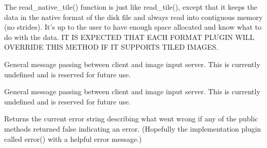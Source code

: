 The {\kw read_native_tile()} function is just like {\kw read_tile()}, 
except that it keeps the data in the native format of the disk file and
always read into contiguous memory (no strides).  It's up to the user to
have enough space allocated and know what to do with the data.  IT IS
EXPECTED THAT EACH FORMAT PLUGIN WILL OVERRIDE THIS METHOD IF IT
SUPPORTS TILED IMAGES.
\apiend

General message passing between client and image input server.
This is currently undefined and is reserved for future use.
\apiend

General message passing between client and image input server.
This is currently undefined and is reserved for future use.
\apiend

Returns the current error string describing what went wrong if
any of the public methods returned {\kw false} indicating an error.
(Hopefully the implementation plugin called {\kw error()} with a
helpful error message.)
\apiend




\chapwidthend
